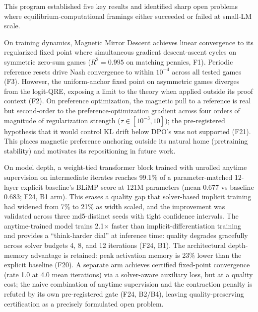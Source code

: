 
This program established five key results and identified sharp open problems where equilibrium-computational framings either succeeded or failed at small-LM scale.

On training dynamics, Magnetic Mirror Descent achieves linear convergence to its regularized fixed point where simultaneous gradient descent-ascent cycles on symmetric zero-sum games ($R^2 = 0.995$ on matching pennies, F1). Periodic reference resets drive Nash convergence to within $10^{-4}$ across all tested games (F3). However, the uniform-anchor fixed point on asymmetric games diverges from the logit-QRE, exposing a limit to the theory when applied outside its proof context (F2). On preference optimization, the magnetic pull to a reference is real but second-order to the preference-optimization gradient across four orders of magnitude of regularization strength ($\tau \in [10^{-3}, 10]$); the pre-registered hypothesis that it would control KL drift below DPO's was not supported (F21). This places magnetic preference anchoring outside its natural home (pretraining stability) and motivates its repositioning in future work.

On model depth, a weight-tied transformer block trained with unrolled anytime supervision on intermediate iterates reaches 99.1\% of a parameter-matched 12-layer explicit baseline's BLiMP score at 121M parameters (mean 0.677 vs baseline 0.683; F24, B1 arm). This erases a quality gap that solver-based implicit training had widened from 7\% to 21\% as width scaled, and the improvement was validated across three md5-distinct seeds with tight confidence intervals. The anytime-trained model trains 2.1× faster than implicit-differentiation training and provides a ``think-harder dial'' at inference time: quality degrades gracefully across solver budgets 4, 8, and 12 iterations (F24, B1). The architectural depth-memory advantage is retained: peak activation memory is 23\% lower than the explicit baseline (F20). A separate arm achieves certified fixed-point convergence (rate 1.0 at 4.0 mean iterations) via a solver-aware auxiliary loss, but at a quality cost; the naive combination of anytime supervision and the contraction penalty is refuted by its own pre-registered gate (F24, B2/B4), leaving quality-preserving certification as a precisely formulated open problem.


